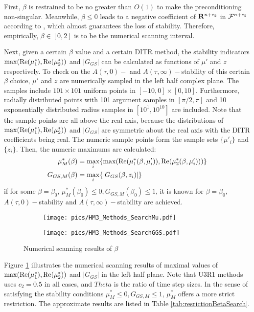 First, $\beta$ is restrained to be no greater than $O(1)$ to make
the preconditioning non-singular.
Meanwhile, $\beta\leq 0$ leads to a negative coefficient of $\mathbf{R}^{n+c_2}$
in $\mathcal{F}^{n+c_2}$ according to , which almost
guarantees the loss of stability. Therefore, empirically, $\beta\in[0,2]$
is to be the numerical scanning interval.

Next, given a certain $\beta$ value and a certain DITR method, the
stability indicators $\max(\mathrm{Re}(\mu^*_1),\mathrm{Re}(\mu^*_2))$ and $|G_{GS}|$
can be calculated as functions of $\mu'$ and $z$ respectively.
To check on the $A(\tau,0)-$ and $A(\tau,\infty)-$stability of this
certain $\beta$ choice, $\mu'$ and $z$ are numerically sampled
in the left half complex plane. The samples include $101\times101$
uniform points in $[-10,0]\times[0,10]$. Furthermore, radially distributed
points with 101 argument samples in $[\pi/2,\pi]$ and 10 exponentially
distributed radius samples in $[10^1, 10^{10}]$ are included.
Note that the sample points are all above the real axis, because the
distributions of $\max(\mathrm{Re}(\mu^*_1),\mathrm{Re}(\mu^*_2))$ and $|G_{GS}|$
are symmetric about the real axis with the DITR coefficients being real.
The numeric sample points form the sample
sets $\{\mu'_i\}$ and $\{z_i\}$. Then, the numeric maximums are
calculated:
\begin{equation}
    \begin{aligned}
        \mu^*_{M}(\beta) & = \max_{i}\{\max(\mathrm{Re}(\mu^*_1(\beta,\mu'_i)),\mathrm{Re}(\mu^*_2(\beta,\mu'_i)))\} \\
        G_{GS,M}(\beta)  & = \max_{i}\{|G_{GS}(\beta,z_i)|\}
    \end{aligned}
\end{equation}
if for some $\beta=\beta_0$, $\mu^*_{M}(\beta_0) \leq 0,G_{GS,M}(\beta_0) \leq 1$,
it is known for  $\beta=\beta_0$, $A(\tau,0)-$stability and
$A(\tau,\infty)-$stability are achieved.


\begin{figure}[htbp]
    \centering
    \begin{subfigure}{0.5\textwidth}
        \texttt{[image: pics/HM3\_Methods\_SearchMu.pdf]}
    \end{subfigure}\hfill
    \begin{subfigure}{0.5\textwidth}
        \texttt{[image: pics/HM3\_Methods\_SearchGGS.pdf]}
    \end{subfigure}
    \caption{Numerical scanning results of $\beta$}
    \label{fig:MuGGSSearch}
\end{figure}
Figure \ref{fig:MuGGSSearch} illustrates the numerical scanning
results of maximal values of
$\max(\mathrm{Re}(\mu^*_1),\mathrm{Re}(\mu^*_2))$ and $|G_{GS}|$ in the left
half plane. Note that U3R1 methods uses $c_2=0.5$ in all cases, and $Theta$ is
the ratio of time step sizes.
In the sense of satisfying the stability conditions $\mu^*_{M} \leq 0,G_{GS,M} \leq 1$,
$\mu^*_{M}$ offers a more strict restriction.
The approximate results are listed in Table \ref{tab:resrictionBetaSearch}.

